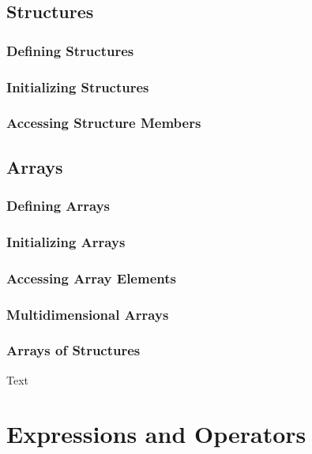 \documentclass{article}
\begin{document}
\subsection{Structures}

\subsubsection{Defining Structures}

\subsubsection{Initializing Structures}

\subsubsection{Accessing Structure Members}

\subsection{Arrays}

\subsubsection{Defining Arrays}

\subsubsection{Initializing Arrays}

\subsubsection{Accessing Array Elements}

\subsubsection{Multidimensional Arrays}

\subsubsection{Arrays of Structures}
Text

\section{Expressions and Operators}
\end{document}
